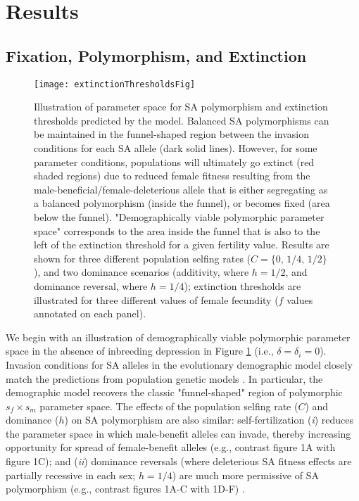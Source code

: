 \documentclass[11pt]{article}
\begin{document}
\section*{Results}\label{sec:Results}

\subsection*{Fixation, Polymorphism, and Extinction}\label{subsec:PolyExt}


 \begin{figure}[htbp]
 \centering
 \texttt{[image: extinctionThresholdsFig]}
 \caption{\footnotesize{Illustration of parameter space for SA polymorphism and extinction thresholds predicted by the model. Balanced SA polymorphisms can be maintained in the funnel-shaped region between the invasion conditions for each SA allele (dark solid lines). However, for some parameter conditions, populations will ultimately go extinct (red shaded regions) due to reduced female fitness resulting from the male-beneficial/female-deleterious allele that is either segregating as a balanced polymorphism (inside the funnel), or becomes fixed (area below the funnel). "Demographically viable polymorphic parameter space" corresponds to the area inside the funnel that is also to the left of the extinction threshold for a given fertility value. Results are shown for three different population selfing rates ($C = \{0,\,1/4,\,1/2\}$), and two dominance scenarios (additivity, where $h = 1/2$, and dominance reversal, where $h = 1/4$); extinction thresholds are illustrated for three different values of female fecundity ($f$ values annotated on each panel).}}
 \label{fig:extThresholds}
 \end{figure}

We begin with an illustration of demographically viable polymorphic parameter space in the absence of inbreeding depression in Figure \ref{fig:extThresholds} (i.e., $\delta = \delta_i = 0$). Invasion conditions for SA alleles in the evolutionary demographic model closely match the predictions from population genetic models \citep{Kidwell1977, JordanConnallon2014, Olito2017}. In particular, the demographic model recovers the classic "funnel-shaped" region of polymorphic $s_f \times s_m$ parameter space. The effects of the population selfing rate ($C$) and dominance ($h$) on SA polymorphism are also similar: self-fertilization ({\itshape i}) reduces the parameter space in which male-benefit alleles can invade, thereby increasing opportunity for spread of female-benefit alleles (e.g., contrast figure 1A with figure 1C); and ({\itshape ii}) dominance reversals (where deleterious SA fitness effects are partially recessive in each sex; $h = 1/4$) are much more permissive of SA polymorphism (e.g., contrast figures 1A-C with 1D-F) \citep{JordanConnallon2014, Olito2017}. 
\end{document}
